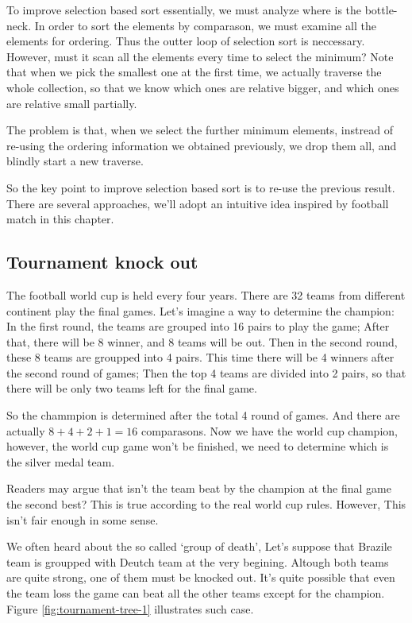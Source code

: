 \documentclass{article}
\begin{document}
To improve selection based sort essentially, we must analyze where is the bottle-neck. In order to sort
the elements by comparason, we must examine all the elements for ordering. Thus the outter loop of selection
sort is neccessary. However, must it scan all the elements every time to select the minimum? Note that
when we pick the smallest one at the first time, we actually traverse the whole collection, so that
we know which ones are relative bigger, and which ones are relative small partially.

The problem is that, when we select the further minimum elements, instread of re-using the ordering information
we obtained previously, we drop them all, and blindly start a new traverse.

So the key point to improve selection based sort is to re-use the previous result. There are several approaches, 
we'll adopt an intuitive idea inspired by football match in this chapter.

\subsection{Tournament knock out}

The football world cup is held every four years. There are 32 teams from different continent 
play the final games. Let's imagine a way to determine the champion: In the first round, the teams
are grouped into 16 pairs to play the game; After that, there will be 8 winner, and 8 teams will
be out. Then in the second round, these 8 teams are groupped into 4 pairs. This time there
will be 4 winners after the second round of games; Then the top 4 teams are divided into 
2 pairs, so that there will be only two teams left for the final game. 

So the chammpion is determined after the total 4 round of games. And there are actually $8+4+2+1 = 16$
comparasons. Now we have the world cup champion, however, the world cup game won't be finished,
we need to determine which is the silver medal team.

Readers may argue that isn't the team beat by the champion at the final game the second best?
This is true according to the real world cup rules. However, This isn't fair enough in some sense.

We often heard about the so called `group of death', Let's suppose that Brazile team is 
groupped with Deutch team at the very begining. Altough both teams are quite strong, one of
them must be knocked out. It's quite possible that even the team loss the game can beat
all the other teams except for the champion. Figure \ref{fig:tournament-tree-1} illustrates such
case.
\end{document}
